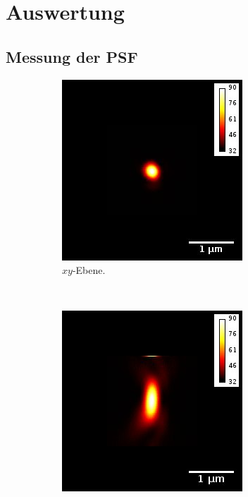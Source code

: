 \section{Auswertung}
\subsection{Messung der PSF}
\begin{figure}
	\centering
	\begin{subfigure}{0.3\textwidth}
		\includegraphics[width=\textwidth]{plots/GoldBeads_3d_640nmxywithbar.jpg}
		\caption{$xy$-Ebene.}
	\end{subfigure}
	~
	\begin{subfigure}{0.3\textwidth}
		\includegraphics[width=\textwidth]{plots/GoldBeads_3d_640nmxzwithbar.jpg}

\end{subfigure}
\end{figure}
